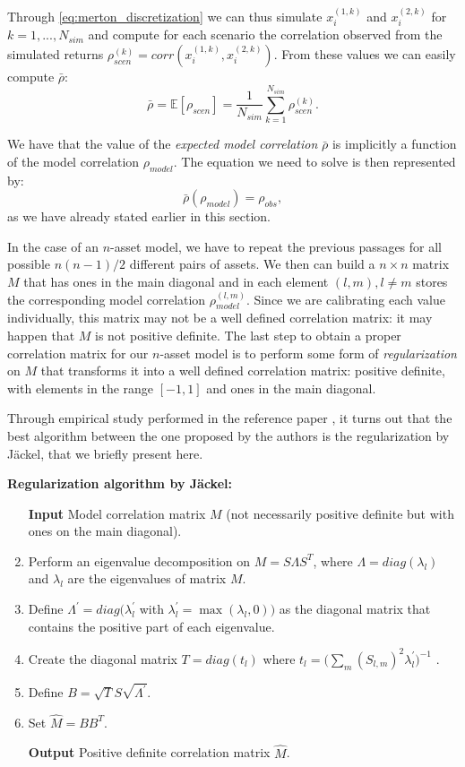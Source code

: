 Through \eqref{eq:merton_discretization} we can thus simulate $ x_i^{(1,k)}$ and 
$ x_i^{(2,k)}$ for $k= 1, ... ,N_{sim}$  and compute for each scenario the correlation observed from the simulated returns $\rho_{scen}^{(k)} = corr(x_i^{(1,k)}, x_i^{(2,k)})$.
From these values we can easily compute $\bar{\rho}$:
\begin{equation}
\label{eq:expected_model_correlation}
	\bar{\rho} = \mathbb{E} [\rho_{scen}] = \frac{1 }{N_{sim}} \sum_{k=1}^{N_{sim}} \rho_{scen}^{(k)}.
\end{equation}


We have that  the value of the \textit{expected model correlation} $\bar{\rho}$ is  implicitly a function of the model correlation $\rho_{model}$. The equation we need to solve is then represented by:
\begin{equation}
\label{eq:expected_observed}
\bar{\rho}(\rho_{model}) = \rho_{obs},
\end{equation}
\noindent
as we have already stated earlier in this section.

\bigskip
In the case of an $n$-asset model, we have to repeat the previous passages for all possible $n(n-1)/2 $ different pairs of assets. We then can build a $n \times n$ matrix $M$ that has ones in the main diagonal and in each element $(l,m), l \neq m$ stores the corresponding model correlation $\rho_{model}^{(l,m)}$.
Since we are calibrating each value individually, this matrix may not be a well defined correlation matrix: it may happen that $M$ is not positive definite.
The last step to obtain a proper correlation matrix for our $n$-asset model is to perform some form of \textit{regularization} on $M$ that transforms it into a well defined correlation matrix: positive definite, with elements in the range $[-1,1]$ and ones in the main diagonal.

Through empirical study performed in the reference paper \citep{PARSIMONIOUS2011}, it turns out that the best algorithm between the one proposed by the authors is the regularization by J\"ackel, that we briefly present here.

\bigskip
\textbf{Regularization algorithm by J\"ackel:}
\begin{enumerate}
	\item[\textbf{Input}] Model correlation matrix $M$ (not necessarily positive definite but with ones on the main diagonal).
	\item Perform an eigenvalue decomposition on $M  = S \Lambda S^T$, where $\Lambda = diag(\lambda_l)$ and $\lambda_l$ are the eigenvalues of matrix $M$.
	\item Define $\Lambda^{'} = diag(\lambda_l^{'}$ with $\lambda_l^{'} = \max(\lambda_l, 0))$ as the diagonal matrix that contains the positive part of each eigenvalue.
	\item Create the diagonal matrix $T = diag(t_l)$ where $t_l =\big(\sum_{m} (S_{l,m})^2 \lambda_l^{'}\big)^{-1}$ .
	\item Define $B = \sqrt{T} S \sqrt{\Lambda^{'}}$.
	\item Set $\widehat{M} = B B^T$.
	\item[\textbf{Output}] Positive definite correlation matrix $\widehat{M}$.
\end{enumerate}


